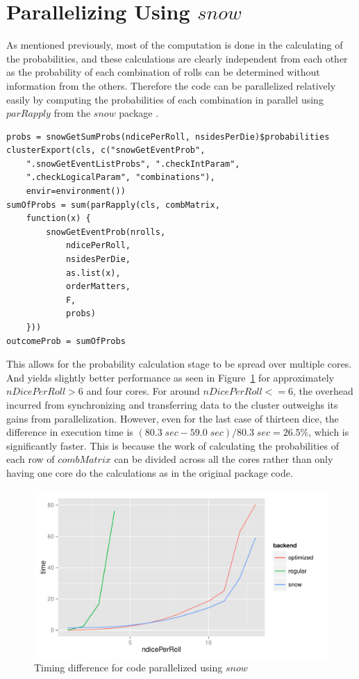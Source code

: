 \documentclass[12pt]{article}
\begin{document}
\section{Parallelizing Using $snow$}

As mentioned previously, most of the computation is done in the calculating of the probabilities, and these calculations are clearly independent from each other as the probability of each combination of rolls can be determined without information from the others. Therefore the code can be parallelized relatively easily by computing the probabilities of each combination in parallel using $parRapply$ from the $snow$ package \cite{snow}.

\begin{lstlisting}
probs = snowGetSumProbs(ndicePerRoll, nsidesPerDie)$probabilities
clusterExport(cls, c("snowGetEventProb",
	".snowGetEventListProbs", ".checkIntParam",
	".checkLogicalParam", "combinations"),
	envir=environment())
sumOfProbs = sum(parRapply(cls, combMatrix,
	function(x) {
		snowGetEventProb(nrolls,
			ndicePerRoll,
			nsidesPerDie,
			as.list(x),
			orderMatters,
			F,
			probs)
	}))
outcomeProb = sumOfProbs
\end{lstlisting}

This allows for the probability calculation stage to be spread over multiple cores. And yields slightly better performance as seen in Figure~\ref{snowComparison} for approximately $nDicePerRoll > 6$ and four cores. For around $nDicePerRoll <= 6$, the overhead incurred from synchronizing and transferring data to the cluster outweighs its gains from parallelization. However, even for the last case of thirteen dice, the difference in execution time is $(80.3\;sec -59.0\;sec)/80.3\;sec = 26.5\%$, which is significantly faster. This is because the work of calculating the probabilities of each row of $combMatrix$ can be divided across all the cores rather than only having one core do the calculations as in the original package code.

\begin{figure}[h!]
	\centering
	\includegraphics[width=6in]{snowComparison.pdf}
	\caption{Timing difference for code parallelized using $snow$}
	\label{snowComparison}
\end{figure}
\end{document}
